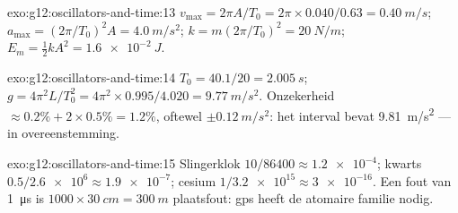 \begin{solution}{exo:g12:oscillators-and-time:13}
$v_{\max} = 2\pi A/T_0 = 2\pi \times 0.040/0.63 = \qty{0.40}{m/s}$;
$a_{\max} = (2\pi/T_0)^2 A = \qty{4.0}{m/s^2}$; $k = m(2\pi/T_0)^2
= \qty{20}{N/m}$; $E_m = \tfrac12 kA^2 = \qty{1.6e-2}{J}$.
\end{solution}

\begin{solution}{exo:g12:oscillators-and-time:14}
$T_0 = 40.1/20 = \qty{2.005}{s}$; $g = 4\pi^2 L/T_0^2 = 4\pi^2
\times 0.995/4.020 = \qty{9.77}{m/s^2}$. Onzekerheid $\approx 0.2\%
+ 2 \times 0.5\% = 1.2\%$, oftewel $\pm\qty{0.12}{m/s^2}$: het interval
bevat \qty{9.81}{m/s^2} --- in overeenstemming.
\end{solution}

\begin{solution}{exo:g12:oscillators-and-time:15}
Slingerklok $10/86400 \approx \num{1.2e-4}$; kwarts $0.5/\num{2.6e6}
\approx \num{1.9e-7}$; cesium $1/\num{3.2e15} \approx \num{3e-16}$. Een fout
van \qty{1}{\micro s} is $\num{1000} \times \qty{30}{cm} = \qty{300}{m}$
plaatsfout: gps heeft de atomaire familie nodig.
\end{solution}

